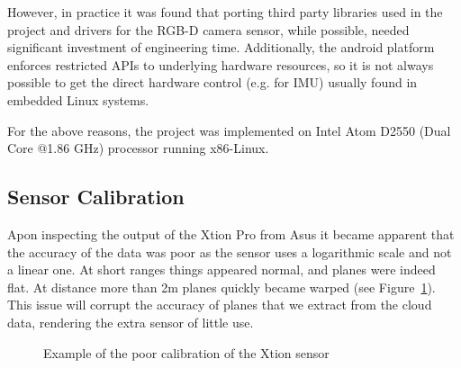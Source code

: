 \documentclass[]{article}
\begin{document}
{However, in practice it was found that porting third party libraries used in the project and drivers for the RGB-D camera sensor, while possible, needed significant investment of engineering time. Additionally, the android platform enforces restricted APIs to underlying hardware resources, so it is not always possible to get the direct hardware control (e.g. for IMU) usually found in embedded Linux systems.

For the above reasons, the project was implemented on Intel Atom D2550 (Dual Core @1.86 GHz) processor running x86-Linux. 


\subsection{Sensor Calibration} %
Apon inspecting the output of the Xtion Pro from Asus it became apparent that the accuracy of the data was poor as the sensor uses a logarithmic scale and not a linear one. At short ranges things appeared normal, and planes were indeed flat. At distance more than 2m planes quickly became warped (see Figure~\ref{fig:uncal5m}). This issue will corrupt the accuracy of planes that we extract from the cloud data, rendering the extra sensor of little use. 

\begin{figure}[H]
\centering     %
{} \;
\caption{Example of the poor calibration of the Xtion sensor}
\label{fig:uncal5m}
\end{figure}


}
\end{document}

